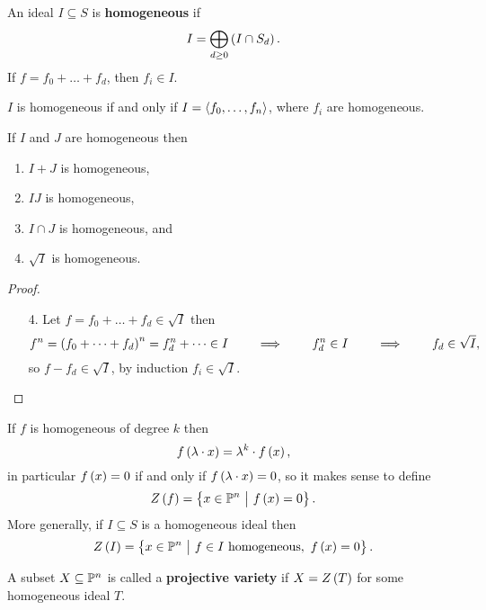 \begin{definition}
An ideal $ I \subseteq S $ is \textbf{homogeneous} if
$$ I = \bigoplus_{d \ge 0} \br{I \cap S_d}. $$
If $ f = f_0 + \dots + f_d $, then $ f_i \in I $.
\end{definition}

\begin{remark}
$ I $ is homogeneous if and only if $ I = \left\langle f_0, \dots, f_n \right\rangle $, where $ f_i $ are homogeneous.
\end{remark}

\begin{lemma}
If $ I $ and $ J $ are homogeneous then
\begin{enumerate}
\item $ I + J $ is homogeneous,
\item $ IJ $ is homogeneous,
\item $ I \cap J $ is homogeneous, and
\item $ \sqrt{I} $ is homogeneous.
\end{enumerate}
\end{lemma}

\begin{proof}
\hfill
\begin{itemize}
\item[4.] Let $ f = f_0 + \dots + f_d \in \sqrt{I} $ then
$$ f^n = \br{f_0 + \dots + f_d}^n = f_d^n + \dots \in I \qquad \implies \qquad f_d^n \in I \qquad \implies \qquad f_d \in \sqrt{I}, $$
so $ f - f_d \in \sqrt{I} $, by induction $ f_i \in \sqrt{I} $.
\end{itemize}
\end{proof}

\begin{definition}
If $ f $ is homogeneous of degree $ k $ then
$$ f\br{\lambda \cdot x} = \lambda^k \cdot f\br{x}, $$
in particular $ f\br{x} = 0 $ if and only if $ f\br{\lambda \cdot x} = 0 $, so it makes sense to define
$$ Z\br{f} = \cbr{x \in \PP^n \st f\br{x} = 0}. $$
More generally, if $ I \subseteq S $ is a homogeneous ideal then
$$ Z\br{I} = \cbr{x \in \PP^n \st f \in I \ \text{homogeneous}, \ f\br{x} = 0}. $$
\end{definition}

\pagebreak

\begin{definition}
A subset $ X \subseteq \mathbb{P}^n $ is called a \textbf{projective variety} if $ X = Z\br{T} $ for some homogeneous ideal $ T $.
\end{definition}

